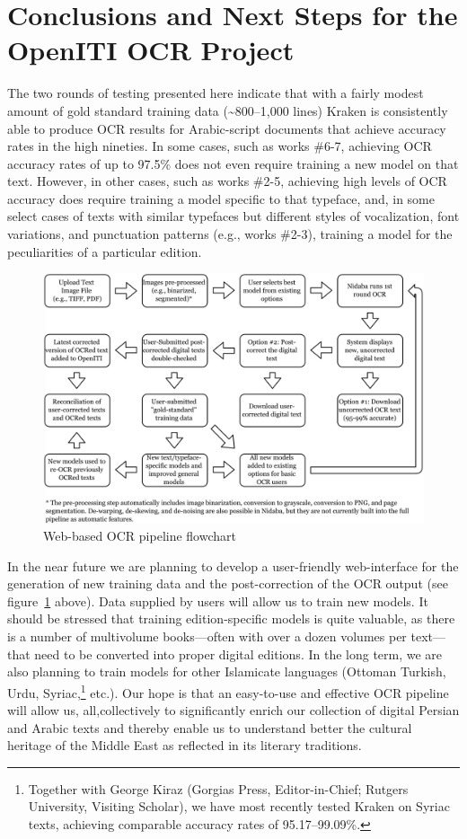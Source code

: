 \section{Conclusions and Next Steps for the OpenITI OCR Project}

The two rounds of testing presented here indicate that with a fairly modest
amount of gold standard training data (\textasciitilde800–1,000 lines) Kraken is
consistently able to produce OCR results for Arabic-script documents that
achieve accuracy rates in the high nineties. In some cases, such as works
\#6-7, achieving OCR accuracy rates of up to 97.5\% does not even require
training a new model on that text. However, in other cases, such as works
\#2-5, achieving high levels of OCR accuracy does require training a model
specific to that typeface, and, in some select cases of texts with similar
typefaces but different styles of vocalization, font variations, and
punctuation patterns (e.g., works \#2-3), training a model for the
peculiarities of a particular edition.

\begin{figure}
        \centering
        \includegraphics[width=\textwidth]{images/image3.png}
	\caption{Web-based OCR pipeline flowchart}
	\label{fig:soa_2}
\end{figure}
  

In the near future we are planning to develop a user-friendly web-interface for
the generation of new training data and the post-correction of the OCR output
(see figure~\ref{fig:soa_2} above). Data supplied by users will allow us to train new
models. It should be stressed that training edition-specific models is quite
valuable, as there is a number of multivolume books—often with over a dozen
volumes per text—that need to be converted into proper digital editions. In the
long term, we are also planning to train models for other Islamicate languages
(Ottoman Turkish, Urdu, Syriac,\footnote{Together with George Kiraz (Gorgias
Press, Editor-in-Chief; Rutgers University, Visiting Scholar), we have most
recently tested Kraken on Syriac texts, achieving comparable accuracy rates of
95.17–99.09\%.} etc.). Our hope is that an easy-to-use and effective OCR
pipeline will allow us, all,collectively to significantly enrich our collection
of digital Persian and Arabic texts and thereby enable us to understand better
the cultural heritage of the Middle East as reflected in its literary
traditions.



